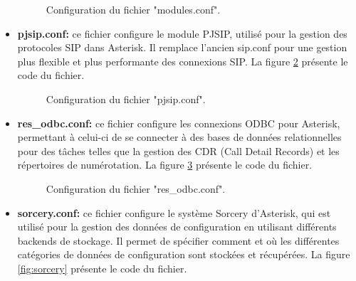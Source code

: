 \begin{itemize}
\begin{figure}[H]
        \caption{Configuration du fichier "modules.conf".}
        \label{fig:mod}
    \end{figure}
    \item \textbf{pjsip.conf:} ce fichier configure le module PJSIP, utilisé pour la gestion des protocoles SIP dans Asterisk. Il remplace l’ancien sip.conf pour une gestion plus flexible et plus performante des connexions SIP. La figure \ref{fig:pjsip} présente le code du fichier.
   \begin{figure}[H]
        \centering
        \caption{Configuration du fichier "pjsip.conf".}
        \label{fig:pjsip}
    \end{figure}
    \item \textbf{res_odbc.conf:} ce fichier configure les connexions ODBC pour Asterisk, permettant à celui-ci de se connecter à des bases de données relationnelles pour des tâches telles que la gestion des CDR (Call Detail Records) et les répertoires de numérotation. La figure \ref{fig:odbc} présente le code du fichier.
   \begin{figure}[H]
        \centering
        \caption{Configuration du fichier "res_odbc.conf".}
        \label{fig:odbc}
    \end{figure}
    \item \textbf{sorcery.conf:} ce fichier configure le système Sorcery d’Asterisk, qui est utilisé pour la gestion des données de configuration en utilisant différents backends de stockage. Il permet de spécifier comment et où les différentes catégories de données de configuration sont stockées et récupérées. La figure \ref{fig:sorcery} présente le code du fichier.

\end{itemize}
